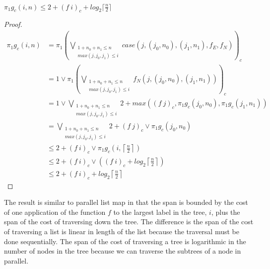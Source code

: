 \paragraph{}
%
\begin{lemma}
	$\pi_1 g_c(i,n) \leq 2 + (f\ i)_c + log_2 \lceil \frac{n}{2} \rceil$
\end{lemma}
%
\begin{proof}
\begin{align*}
    \pi_1 g_c(i,n) &= \pi_1 (\bigvee\limits_{\substack{1 + n_0 + n_1 \leq n \\ max(j,j_0,j_1) \leq i}} case(j,(j_0,n_0),(j_1,n_1), f_E, f_N))_c \\
                  &= 1 \vee \pi_1 (\bigvee\limits_{\substack{1 + n_0 + n_1 \leq n \\ max(j,j_0,j_1) \leq i}} f_N(j,(j_0,n_0),(j_1,n_1)))_c \\
                  &= 1 \vee \bigvee\limits_{\substack{1 + n_0 + n_1 \leq n \\ max(j,j_0,j_1) \leq i}} 2 + max((f\ j)_c,\pi_1 g_c(j_0,n_0),\pi_1 g_c(j_1,n_1)) \\
                  &= \bigvee\limits_{\substack{1 + n_0 + n_1 \leq n \\ max(j,j_0,j_1) \leq i}} 2 + (f\ j)_c \vee \pi_1 g_c(j_0,n_0) \\
                  &\leq 2 + (f\ i)_c \vee \pi_1 g_c(i,\left\lceil \frac{n}{2} \right\rceil) \\
									&\leq 2 + (f\ i)_c \vee ((f\ i)_c + log_2 \left\lceil \frac{n}{2} \right\rceil) \\
									&\leq 2 + (f\ i)_c + log_2 \left\lceil \frac{n}{2} \right\rceil
\end{align*}
\end{proof}
%
The result is similar to parallel list map in that the span is bounded by the
cost of one application of the function $f$ to the largest label in the tree,
$i$, plus the span of the cost of traversing down the tree. The difference is
the span of the cost of traversing a list is linear in length of the list
because the traversal must be done sequentially. The span of the cost of
traversing a tree is logarithmic in the number of nodes in the tree because we
can traverse the subtrees of a node in parallel.
